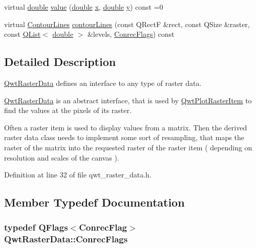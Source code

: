 \begin{DoxyCompactItemize}
virtual \hyperlink{_super_l_u_support_8h_a8956b2b9f49bf918deed98379d159ca7}{double} \hyperlink{class_qwt_raster_data_a6396fc013fcec893b1e8cea4cf03691e}{value} (\hyperlink{_super_l_u_support_8h_a8956b2b9f49bf918deed98379d159ca7}{double} \hyperlink{glext_8h_a1db9d104e3c2128177f26aff7b46982f}{x}, \hyperlink{_super_l_u_support_8h_a8956b2b9f49bf918deed98379d159ca7}{double} \hyperlink{glext_8h_a42315f3ed8fff752bb47fd782309fcfc}{y}) const =0
\item 
virtual \hyperlink{class_qwt_raster_data_adc6679160a229992f0870a2b784985f3}{Contour\-Lines} \hyperlink{class_qwt_raster_data_a1fa90434ddeeeeaacb80657e49af8fe1}{contour\-Lines} (const Q\-Rect\-F \&rect, const Q\-Size \&raster, const \hyperlink{class_q_list}{Q\-List}$<$ \hyperlink{_super_l_u_support_8h_a8956b2b9f49bf918deed98379d159ca7}{double} $>$ \&levels, \hyperlink{class_qwt_raster_data_a8101f4a0c71813d49fcdc73a457c4874}{Conrec\-Flags}) const 
\end{DoxyCompactItemize}


\subsection{Detailed Description}
\hyperlink{class_qwt_raster_data}{Qwt\-Raster\-Data} defines an interface to any type of raster data. 

\hyperlink{class_qwt_raster_data}{Qwt\-Raster\-Data} is an abstract interface, that is used by \hyperlink{class_qwt_plot_raster_item}{Qwt\-Plot\-Raster\-Item} to find the values at the pixels of its raster.

Often a raster item is used to display values from a matrix. Then the derived raster data class needs to implement some sort of resampling, that maps the raster of the matrix into the requested raster of the raster item ( depending on resolution and scales of the canvas ). 

Definition at line 32 of file qwt\-\_\-raster\-\_\-data.\-h.



\subsection{Member Typedef Documentation}
\hypertarget{class_qwt_raster_data_a8101f4a0c71813d49fcdc73a457c4874}{
\subsubsection[{Conrec\-Flags}]{\setlength{\rightskip}{0pt plus 5cm}typedef Q\-Flags$<${\bf Conrec\-Flag}$>$ {\bf Qwt\-Raster\-Data\-::\-Conrec\-Flags}}}\label{class_qwt_raster_data_a8101f4a0c71813d49fcdc73a457c4874}


